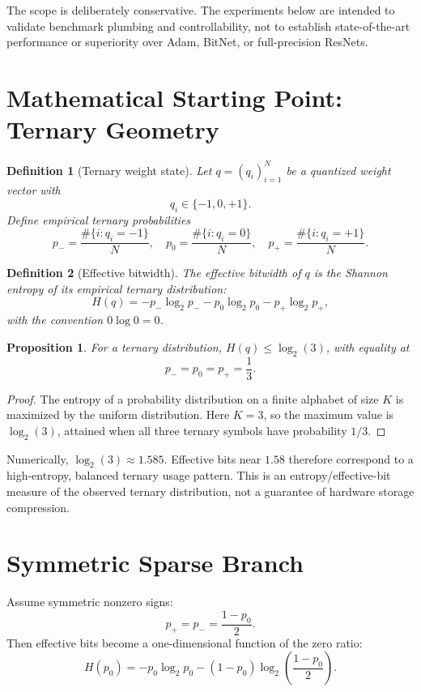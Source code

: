 \documentclass[11pt]{article}
\newtheorem{proposition}{Proposition}
\newtheorem{definition}{Definition}
\begin{document}
The scope is deliberately conservative. The experiments below are intended to validate benchmark plumbing and controllability, not to establish state-of-the-art performance or superiority over Adam, BitNet, or full-precision ResNets.

\section{Mathematical Starting Point: Ternary Geometry}

\begin{definition}[Ternary weight state]
Let $q=(q_i)_{i=1}^N$ be a quantized weight vector with
\[
q_i \in \{-1,0,+1\}.
\]
Define empirical ternary probabilities
\[
p_-=\frac{\#\{i:q_i=-1\}}{N},\quad
p_0=\frac{\#\{i:q_i=0\}}{N},\quad
p_+=\frac{\#\{i:q_i=+1\}}{N}.
\]
\end{definition}

\begin{definition}[Effective bitwidth]
The effective bitwidth of $q$ is the Shannon entropy of its empirical ternary distribution:
\[
H(q)
=-p_-\log_2 p_- - p_0\log_2 p_0 - p_+\log_2 p_+,
\]
with the convention $0\log 0=0$.
\end{definition}

\begin{proposition}
For a ternary distribution, $H(q)\leq \log_2(3)$, with equality at
\[
p_-=p_0=p_+=\frac{1}{3}.
\]
\end{proposition}

\begin{proof}
The entropy of a probability distribution on a finite alphabet of size $K$ is maximized by the uniform distribution. Here $K=3$, so the maximum value is $\log_2(3)$, attained when all three ternary symbols have probability $1/3$.
\end{proof}

Numerically, $\log_2(3)\approx 1.585$. Effective bits near $1.58$ therefore correspond to a high-entropy, balanced ternary usage pattern. This is an entropy/effective-bit measure of the observed ternary distribution, not a guarantee of hardware storage compression.

\section{Symmetric Sparse Branch}

Assume symmetric nonzero signs:
\[
p_+=p_-=\frac{1-p_0}{2}.
\]
Then effective bits become a one-dimensional function of the zero ratio:
\[
H(p_0)
=-p_0\log_2 p_0
-(1-p_0)\log_2\left(\frac{1-p_0}{2}\right).
\]
\end{document}
